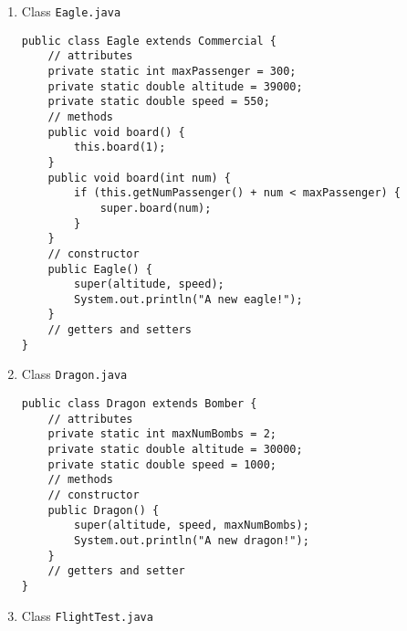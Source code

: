 \documentclass[12pt,letterpaper,twoside]{article}
\begin{document}
\begin{enumerate}
\item Class \texttt{Eagle.java}

\lstset{language=java,tabsize=2}
\begin{lstlisting}
public class Eagle extends Commercial {
	// attributes
	private static int maxPassenger = 300;
	private static double altitude = 39000;
	private static double speed = 550;
	// methods
	public void board() {
		this.board(1);
	}
	public void board(int num) {
		if (this.getNumPassenger() + num < maxPassenger) {
			super.board(num);
		}
	}
	// constructor
	public Eagle() {
		super(altitude, speed);
		System.out.println("A new eagle!");
	}
	// getters and setters
}
\end{lstlisting}

\item Class \texttt{Dragon.java}

\lstset{language=java,tabsize=2}
\begin{lstlisting}
public class Dragon extends Bomber {
	// attributes
	private static int maxNumBombs = 2;
	private static double altitude = 30000;
	private static double speed = 1000;
	// methods
	// constructor
	public Dragon() {
		super(altitude, speed, maxNumBombs);
		System.out.println("A new dragon!");
	}
	// getters and setter
}
\end{lstlisting}

\item Class \texttt{FlightTest.java}


\end{enumerate}
\end{document}
